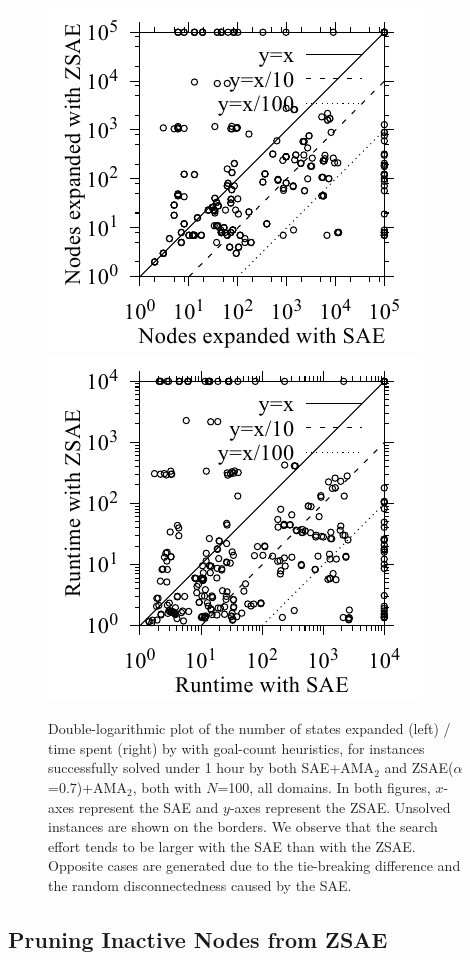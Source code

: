 

\begin{figure}[tb]
 \centering
 \includegraphics[width=0.49\linewidth]{img/static/exp.pdf}
 \includegraphics[width=0.49\linewidth]{img/static/time.pdf}
 \caption{
Double-logarithmic plot of the number of states expanded (left) / time spent (right) by
\astar with goal-count heuristics,
for instances successfully solved under 1 hour by both SAE+AMA$_2$ and ZSAE($\alpha$=0.7)+AMA$_2$, both with $N$=100, all domains.
In both figures,
$x$-axes represent the SAE and $y$-axes represent the ZSAE.
Unsolved instances are shown on the borders.
% 
We observe that the search effort tends to be larger with the SAE than with the ZSAE.
Opposite cases are generated due to
the tie-breaking difference and
the random disconnectedness caused by the SAE.
}
 \label{fig:ama2-statistics}
\end{figure}


\subsection{Pruning Inactive Nodes from ZSAE}

